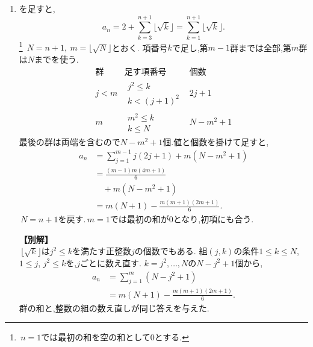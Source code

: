     \noindent {}\par\nobreak
    \begin{enumerate}[label=(\arabic*),parsep=3pt,beginpenalty=10000,format=\bookitemlink{example-gauss-role-2}{solution}{problem}]
      \item {}を足すと,
            \[
              a_n=2+\sum_{k=3}^{n+1}\lfloor\sqrt k\rfloor
                  =\sum_{k=1}^{n+1}\lfloor\sqrt k\rfloor.
            \]\footnote{\,$n=1$では最初の和を空の和として0とする.}
            \,$N=n+1,\ m=\lfloor\sqrt N\rfloor$とおく.
            項番号$k$で足し,第$m-1$群までは全部,第$m$群は$N$までを使う.
            \[
              \begin{array}{c|c|c}
                \text{群}&\text{足す項番号}&\text{個数}\\ \hline
                j<m&\substack{j^2\le k\\ k<(j+1)^2}&2j+1\\
                m&\substack{m^2\le k\\ k\le N}&N-m^2+1
              \end{array}
            \]
            最後の群は両端を含むので$N-m^2+1$個.値と個数を掛けて足すと,
            \begin{align*}
              a_n&=\sum_{j=1}^{m-1}j(2j+1)+m(N-m^2+1)\\
                 &=\frac{(m-1)m(4m+1)}6\\
                 &\quad+m(N-m^2+1)\\
                 &=m(N+1)-\frac{m(m+1)(2m+1)}6.
            \end{align*}
            \,$N=n+1$を戻す.\,$m=1$では最初の和が0となり,初項にも合う.

            \noindent \textbf{【別解】}\\
            \,$\lfloor\sqrt k\rfloor$は$j^2\le k$を満たす正整数$j$の個数でもある.
            組$(j,k)$の条件$1\le k\le N$, $1\le j$, $j^2\le k$を,$j$ごとに数え直す.
            $k=j^2,\ldots,N$の$N-j^2+1$個から,
            \begin{align*}
              a_n&=\sum_{j=1}^{m}(N-j^2+1)\\
                 &=m(N+1)-\frac{m(m+1)(2m+1)}6.
            \end{align*}
            群の和と,整数の組の数え直しが同じ答えを与えた.
    \end{enumerate}

